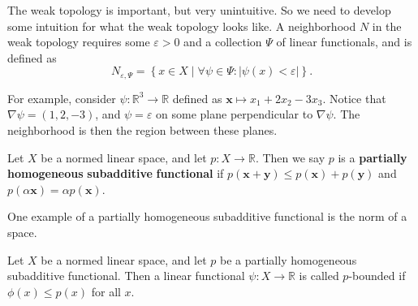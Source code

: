 \documentclass[11pt, letterpaper]{report}
\begin{document}
The weak topology is important, but very unintuitive. So we need to develop some intuition for what the weak topology looks like. A neighborhood $N$ in the weak topology requires some $\varepsilon >0$ and a collection $\Psi $ of linear functionals, and is defined as
\[
	N_{\varepsilon ,\Psi }=\left\{ x\in X \mid \forall \psi \in \Psi : \left| \psi (x)<\varepsilon  \right|  \right\}
.\]

For example, consider $\psi : \mathbb{R}^3 \to \mathbb{R}$ defined as $\mathbf{x}\mapsto x_1+2x_2-3x_3$. Notice that $\nabla \psi =(1,2,-3)$, and $\psi =\varepsilon $ on some plane perpendicular to $\nabla \psi $. The neighborhood is then the region between these planes.
\begin{definition}\label{dfn:2.27}
	Let $X$ be a normed linear space, and let $p : X \to \mathbb{R}$. Then we say $p$ is a \textbf{partially} \textbf{homogeneous} \textbf{subadditive} \textbf{functional} if $p(\mathbf{x}+\mathbf{y})\leq p(\mathbf{x})+p(\mathbf{y})$ and $p(\alpha \mathbf{x})=\alpha p(\mathbf{x})$.
\end{definition}
One example of a partially homogeneous subadditive functional is the norm of a space.
\begin{definition}[$p$-bounded]\label{dfn:2.28}
	Let $X$ be a normed linear space, and let $p$ be a partially homogeneous subadditive functional. Then a linear functional $\psi : X \to \mathbb{R}$ is called $p$-bounded if $\phi (x)\leq p(x)$ for all $x$.
\end{definition}
\end{document}
